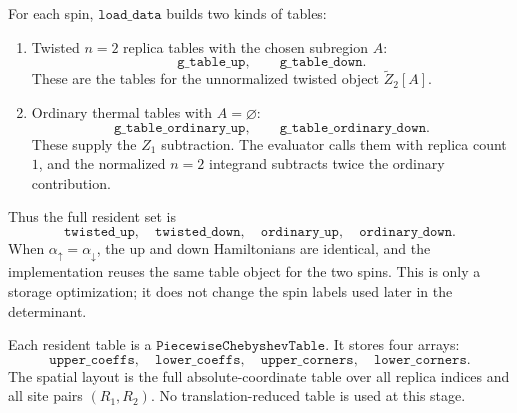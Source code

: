 \documentclass[11pt]{article}
\newcommand{\1}{\mathbf{1}}
\begin{document}
For each spin, \(\texttt{load\_data}\) builds two kinds of tables:
\begin{enumerate}[leftmargin=2em]
  \item Twisted \(n=2\) replica tables with the chosen subregion \(A\):
  \[
    \texttt{g\_table\_up},\qquad \texttt{g\_table\_down}.
  \]
  These are the tables for the unnormalized twisted object
  \(\widetilde Z_2[A]\).
  \item Ordinary thermal tables with \(A=\varnothing\):
  \[
    \texttt{g\_table\_ordinary\_up},\qquad
    \texttt{g\_table\_ordinary\_down}.
  \]
  These supply the \(Z_1\) subtraction.  The evaluator calls them with
  replica count \(1\), and the normalized \(n=2\) integrand subtracts twice
  the ordinary contribution.
\end{enumerate}
Thus the full resident set is
\[
  \texttt{twisted\_up},\quad
  \texttt{twisted\_down},\quad
  \texttt{ordinary\_up},\quad
  \texttt{ordinary\_down}.
\]
When \(\alpha_\uparrow=\alpha_\downarrow\), the up and down Hamiltonians are
identical, and the implementation reuses the same table object for the two
spins.  This is only a storage optimization; it does not change the spin labels
used later in the determinant.

Each resident table is a \(\texttt{PiecewiseChebyshevTable}\).  It stores four
arrays:
\[
  \texttt{upper\_coeffs},\quad
  \texttt{lower\_coeffs},\quad
  \texttt{upper\_corners},\quad
  \texttt{lower\_corners}.
\]
The spatial layout is the full absolute-coordinate table over all replica
indices and all site pairs \((R_1,R_2)\).  No translation-reduced table is used
at this stage.
\end{document}
